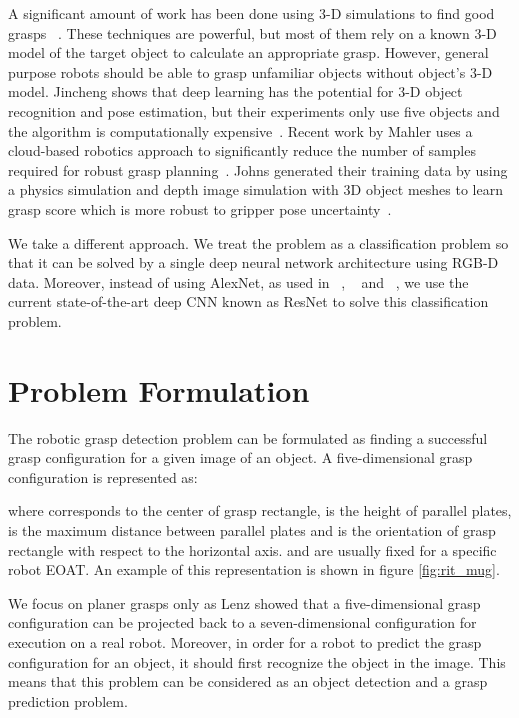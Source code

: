\documentclass[10pt,twocolumn,letterpaper]{article}
\begin{document}
A significant amount of work has been done using 3-D simulations to find good grasps ~\cite{bohg2010learning,krainin2011autonomous,5509508,5649406}. These techniques are powerful, but most of them rely on a known 3-D model of the target object to calculate an appropriate grasp. However, general purpose robots should be able to grasp unfamiliar objects without object's 3-D model. Jincheng \etal shows that deep learning has the potential for 3-D object recognition and pose estimation, but their experiments only use five objects and the algorithm is computationally expensive~\cite{yu2013vision}. Recent work by Mahler \etal uses a cloud-based robotics approach to significantly reduce the number of samples required for robust grasp planning~\cite{7487342}. Johns \etal generated their training data by using a physics simulation and depth image simulation with 3D object meshes to learn grasp score which is more robust to gripper pose uncertainty~\cite{johns2016deep}.

We take a different approach. We treat the problem as a classification problem so that it can be solved by a single deep neural network architecture using RGB-D data. Moreover, instead of using AlexNet, as used in ~\cite{lenz2015deep}, ~\cite{7487517} and ~\cite{Redmon}, we use the current state-of-the-art deep CNN known as ResNet to solve this classification problem.




\section{Problem Formulation}
The robotic grasp detection problem can be formulated as finding a successful grasp configuration  for a given image  of an object. A five-dimensional grasp configuration  is represented as:

where  corresponds to the center of grasp rectangle,  is the height of parallel plates,  is the maximum distance between parallel plates and  is the orientation of grasp rectangle with respect to the horizontal axis.  and  are usually fixed for a specific robot EOAT. An example of this representation is shown in figure \ref{fig:rit_mug}. 

We focus on planer grasps only as Lenz \etal showed that a five-dimensional grasp configuration can be projected back to a seven-dimensional configuration for execution on a real robot. Moreover, in order for a robot to predict the grasp configuration for an object, it should first recognize the object in the image. This means that this problem can be considered as an object detection and a grasp prediction problem.
\end{document}

